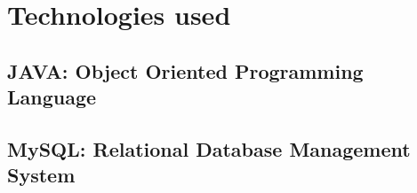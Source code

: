 \section{Technologies used}

\subsection{JAVA: Object Oriented Programming Language}

\subsection{MySQL: Relational Database Management System}
